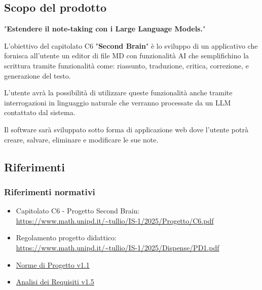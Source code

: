 \documentclass[a4paper,10pt]{article}
\begin{document}
\subsection{Scopo del prodotto}
"\textbf{Estendere il note-taking con i Large Language Models.}"

L'obiettivo del capitolato C6 "\textbf{Second Brain}" è lo sviluppo di un applicativo che fornisca all'utente un editor di file MD con funzionalità AI che semplifichino la scrittura tramite funzionalità come: riassunto, traduzione, critica, correzione, e generazione del testo.

L'utente avrà la possibilità di utilizzare queste funzionalità anche tramite interrogazioni in linguaggio naturale che verranno processate da un LLM contattato dal sistema.

Il software sarà sviluppato sotto forma di applicazione web dove l'utente potrà creare, salvare, eliminare e modificare le sue note.

\subsection{Riferimenti}
\subsubsection{Riferimenti normativi}
\begin{itemize}
  \item Capitolato C6 - Progetto Second Brain: \\  \url{https://www.math.unipd.it/~tullio/IS-1/2025/Progetto/C6.pdf}
  \item Regolamento progetto didattico: \\ \url{https://www.math.unipd.it/~tullio/IS-1/2025/Dispense/PD1.pdf}
  \item \href{https://tool-8.github.io/Documentazione-SWE/pb/Norme_di_Progetto_v1.1.pdf}{Norme di Progetto v1.1}
  \item \href{https://tool-8.github.io/Documentazione-SWE/pb/Analisi_dei_Requisiti_v1.5.pdf}{Analisi dei Requisiti v1.5}
\end{itemize}
\end{document}
